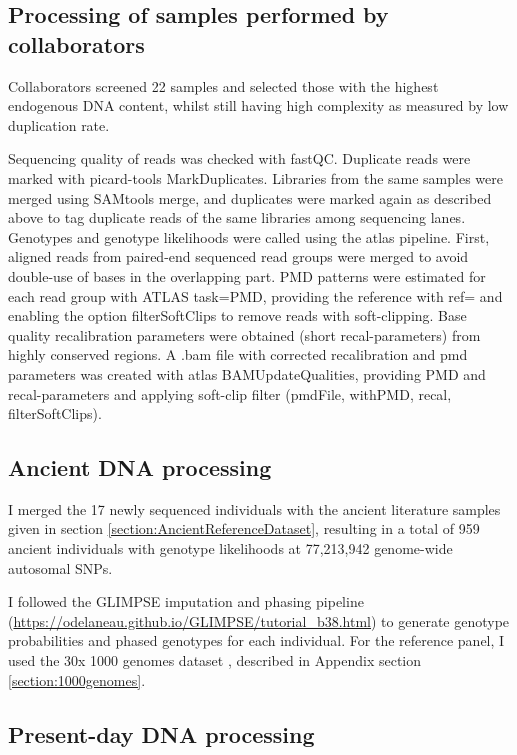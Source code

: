 \subsection{Processing of samples performed by collaborators}

Collaborators screened 22 samples and selected those with the highest endogenous DNA content, whilst still having high complexity as measured by low duplication rate.

Sequencing quality of reads was checked with fastQC. Duplicate reads were marked with picard-tools MarkDuplicates. Libraries from the same samples were merged using SAMtools merge, and duplicates were marked again as described above to tag duplicate reads of the same libraries among sequencing lanes. Genotypes and genotype likelihoods were called using the atlas pipeline. First, aligned reads from paired-end sequenced read groups were merged to avoid double-use of bases in the overlapping part. PMD patterns were estimated for each read group with ATLAS task=PMD, providing the reference with ref= and enabling the option filterSoftClips to remove reads with soft-clipping. 
Base quality recalibration parameters were obtained (short recal-parameters) from highly conserved regions. A .bam file with corrected recalibration and pmd parameters was created with atlas BAMUpdateQualities, providing PMD and recal-parameters and applying soft-clip filter (pmdFile, withPMD, recal, filterSoftClips).

\subsection{Ancient DNA processing} \label{AncientDNAprocessing}

I merged the 17 newly sequenced individuals with the ancient literature samples given in section \ref{section:AncientReferenceDataset}, resulting in a total of 959 ancient individuals with genotype likelihoods at 77,213,942 genome-wide autosomal SNPs. 

I followed the GLIMPSE \cite{rubinacci2021efficient} imputation and phasing pipeline (\url{https://odelaneau.github.io/GLIMPSE/tutorial_b38.html}) to generate genotype probabilities and phased genotypes for each individual. For the reference panel, I used the 30x 1000 genomes dataset \cite{byrska2021high}, described in Appendix section \ref{section:1000genomes}.  

\subsection{Present-day DNA processing} \label{PresentdayDNAprocessing}

